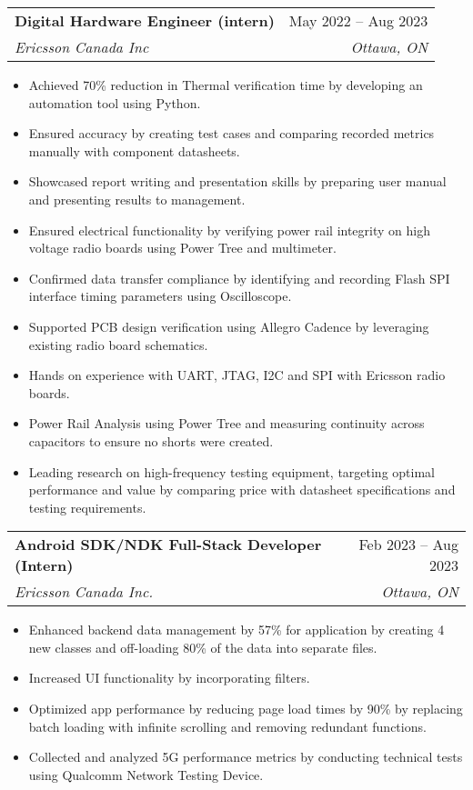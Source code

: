 \documentclass[A4,10pt]{article}
\makeatletter
\newcommand{\resumeItem}[1]{
  \item\small{
    {#1 \vspace{-2pt}}
  }
}
\newcommand{\resumeSubheading}[4]{
  \vspace{-2pt}\item
    \begin{tabular*}{0.97\textwidth}[t]{l@{\extracolsep{\fill}}r}
      \textbf{#1} & #2 \\
      \textit{\small#3} & \textit{\small #4} \\
    \end{tabular*}\vspace{-7pt}
}
\newcommand{\resumeSubSubheading}[2]{
    \item
    \begin{tabular*}{0.97\textwidth}{l@{\extracolsep{\fill}}r}
      \textit{\small#1} & \textit{\small #2} \\
    \end{tabular*}\vspace{-7pt}
}
\newcommand{\resumeSubHeadingListEnd}{\end{itemize}}
\newcommand{\resumeItemListStart}{\begin{itemize}}
\newcommand{\resumeItemListEnd}{\end{itemize}\vspace{-5pt}}
\makeatother
\begin{document}
    \resumeSubheading
      {Digital Hardware Engineer (intern)}{May 2022 -- Aug 2023}
      {Ericsson Canada Inc}{Ottawa, ON}
      \resumeItemListStart
        \resumeItem{Achieved 70\% reduction in Thermal verification time by developing an automation tool using Python.}
        \resumeItem{Ensured accuracy by creating test cases and comparing recorded metrics manually with component datasheets.}
        \resumeItem{Showcased report writing and presentation skills by preparing user manual and presenting results to management.}
        \resumeItem{Ensured electrical functionality by verifying power rail integrity on high voltage radio boards using Power Tree and multimeter.}
        \resumeItem{Confirmed data transfer compliance by identifying and recording Flash SPI interface timing parameters using Oscilloscope.}
        \resumeItem{Supported PCB design verification using Allegro Cadence by leveraging existing radio board schematics.}
        \resumeItem{Hands on experience with UART, JTAG, I2C and SPI with Ericsson radio boards.}
        \resumeItem{Power Rail Analysis using Power Tree and measuring continuity across capacitors to ensure no shorts were created.}
        \resumeItem{Leading research on high-frequency testing equipment, targeting optimal performance and value by comparing price with datasheet specifications and testing requirements.}
      \resumeItemListEnd
      


    \resumeSubheading
      {Android SDK/NDK Full-Stack Developer (Intern)}{Feb 2023 -- Aug 2023}
      {Ericsson Canada Inc.}{Ottawa, ON}
      \resumeItemListStart
        \resumeItem{Enhanced backend data management by 57\% for application by creating 4 new classes and off-loading 80\% of the data into separate files.}
        \resumeItem{Increased UI functionality by incorporating filters.}
        \resumeItem{Optimized app performance by reducing page load times by 90\% by replacing batch loading with infinite scrolling and removing redundant functions.}
        \resumeItem{Collected and analyzed 5G performance metrics by conducting technical tests using Qualcomm Network Testing Device.}
      \resumeItemListEnd
\end{document}
